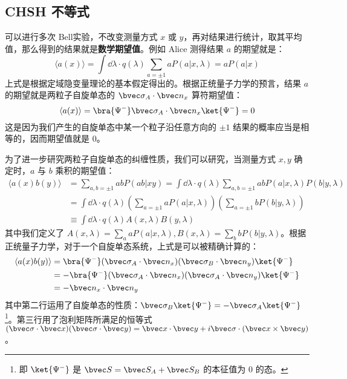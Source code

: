 \subsection{CHSH 不等式}
可以进行多次 Bell实验，不改变测量方式 $x$ 或 $y$，再对结果进行统计，取其平均值，那么得到的结果就是\textbf{数学期望值}。例如 Alice 测得结果 $a$ 的期望就是：
\begin{equation}
\langle a(x) \rangle =\int \dd \lambda \cdot q(\lambda) \sum_{a=\pm 1}a P(a|x,\lambda) = a P(a|x)
\end{equation}
上式是根据定域隐变量理论的基本假定得出的。根据正统量子力学的预言，结果 $a$ 的期望就是两粒子自旋单态的 $\bvec \sigma_A\cdot \bvec n_x$ 算符期望值：
\begin{equation}
\langle a(x)\rangle = \bra{\Psi^-} \bvec \sigma_A \cdot \bvec n_x \ket{\Psi^-} = 0
\end{equation}
这是因为我们产生的自旋单态中某一个粒子沿任意方向的 $\pm 1$ 结果的概率应当是相等的，因而期望值就是 $0$。

为了进一步研究两粒子自旋单态的纠缠性质，我们可以研究，当测量方式 $x,y$ 确定时，$a$ 与 $b$ 乘积的期望值：
\begin{equation}\label{eq_chsh_1}
\begin{aligned}
\langle a(x)b(y)\rangle &= \sum_{a,b=\pm 1} ab P(ab|xy)=\int \dd\lambda \cdot q(\lambda) \sum_{a,b=\pm 1}abP(a|x,\lambda)P(b|y,\lambda)\\
&=\int \dd\lambda \cdot q(\lambda) \left(\sum_{a=\pm 1}aP(a|x,\lambda)\right)\left(\sum_{a=\pm 1}bP(b|y,\lambda)\right)\\
&\equiv \int \dd\lambda\cdot q(\lambda) A(x,\lambda) B(y,\lambda)
\end{aligned}
\end{equation}
其中我们定义了 $A(x,\lambda)=\sum_a aP(a|x,\lambda),B(x,\lambda)=\sum_b bP(b|y,\lambda)$。根据正统量子力学，对于一个自旋单态系统，上式是可以被精确计算的：
\begin{equation}
\begin{aligned}
\langle a(x)b(y)\rangle &= \bra{\Psi^-} (\bvec \sigma_A\cdot \bvec n_x)(\bvec \sigma_B\cdot \bvec n_y)\ket{\Psi^-}\\
&=-\bra{\Psi^-} (\bvec \sigma_A\cdot \bvec n_x)(\bvec \sigma_A\cdot \bvec n_y)\ket{\Psi^-}\\
&=-\bvec n_x\cdot \bvec n_y
\end{aligned}
\end{equation}
其中第二行运用了自旋单态的性质：$\bvec \sigma_B\ket{\Psi^-}=-\bvec \sigma_A\ket{\Psi^-}$ \footnote{即 $\ket{\Psi^-}$  是 $\bvec S=\bvec S_A+\bvec S_B$ 的本征值为 $0$ 的态。}。第三行用了泡利矩阵所满足的恒等式 $(\bvec \sigma \cdot \bvec x)(\bvec \sigma\cdot \bvec y)=\bvec x\cdot \bvec y+i\bvec \sigma\cdot (\bvec x\times \bvec y)$。

